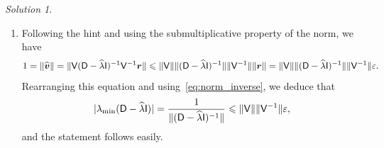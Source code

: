 \documentclass[11pt]{article}
\theoremstyle{definition}
\theoremstyle{remark}
\newtheorem*{solution}{Solution}
\begin{document}
\begin{solution}
\begin{enumerate}
        \item
            Following the hint and using the submultiplicative property of the norm,
            we have
            \[
                1 = \lVert\widehat {\mathbf{\boldsymbol{v}}}\rVert
                = \lVert\mathsf V (\mathsf D - \widehat \lambda \mathsf I)^{-1}  \mathsf V^{-1} {\mathbf{\boldsymbol{r}}}\rVert
                \leqslant \lVert\mathsf V\rVert \lVert(\mathsf D - \widehat \lambda \mathsf I)^{-1}\rVert \lVert\mathsf V^{-1}\rVert \lVert\mathbf{\boldsymbol{r}}\rVert
                = \lVert\mathsf V\rVert \lVert(\mathsf D - \widehat \lambda \mathsf I)^{-1}\rVert \lVert\mathsf V^{-1}\rVert \varepsilon.
            \]
            Rearranging this equation and using~\eqref{eq:norm_inverse},
            we deduce that
            \[
                \lvert\lambda_{\min} (\mathsf D - \widehat \lambda \mathsf I)\rvert
                = \frac{1}{\lVert(\mathsf D - \widehat \lambda \mathsf I)^{-1}\rVert}
                \leqslant \lVert\mathsf V\rVert \lVert\mathsf V^{-1}\rVert \varepsilon,
            \]
            and the statement follows easily.

    \end{enumerate}
\end{solution}
\end{document}
